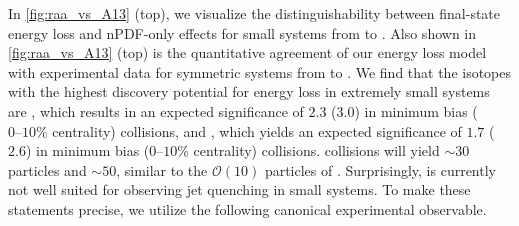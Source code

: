 \documentclass[%
 reprint,
 amsmath,amssymb,
 aps,
 prl,nofootinbib,
 superscriptaddress
]{revtex4-2}
\begin{document}
In \cref{fig:raa_vs_A13} (top), we visualize the distinguishability between final-state energy loss and nPDF-only effects for small systems from \btbt{} to . 
Also shown in \cref{fig:raa_vs_A13} (top) is the quantitative agreement of our energy loss model with experimental data for symmetric systems from \pbpb{} to \oo{}. 
We find that the isotopes with the highest discovery potential for energy loss in extremely small systems are \lili{}, which results in an expected significance of $2.3$ ($3.0$) in minimum bias ($0\text{--}10\%$ centrality) collisions, and , which yields an expected significance of $1.7$ ($2.6$) in minimum bias ($0\text{--}10\%$ centrality) collisions. 
 collisions will yield $\sim 30$ particles and \lili{} $\sim 50$, similar to the $\mathcal{O}(10)$ particles of \cite{Brandstetter:2023jsy}.
Surprisingly,  is currently not well suited for observing jet quenching in small systems.
To make these statements precise, we utilize the following canonical experimental observable.
\end{document}
